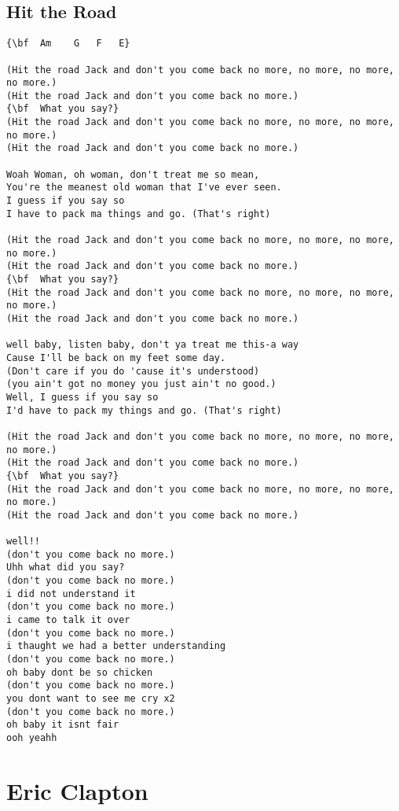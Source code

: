 \documentclass[a4paper]{article}
\begin{document}
\subsection{Hit the Road}
\begin{Verbatim}[commandchars=\\\{\}]
{\bf  Am	G	F	E}

(Hit the road Jack and don't you come back no more, no more, no more, no more.)
(Hit the road Jack and don't you come back no more.)
{\bf  What you say?}
(Hit the road Jack and don't you come back no more, no more, no more, no more.)
(Hit the road Jack and don't you come back no more.)

Woah Woman, oh woman, don't treat me so mean,
You're the meanest old woman that I've ever seen.
I guess if you say so
I have to pack ma things and go. (That's right)

(Hit the road Jack and don't you come back no more, no more, no more, no more.)
(Hit the road Jack and don't you come back no more.)
{\bf  What you say?}
(Hit the road Jack and don't you come back no more, no more, no more, no more.)
(Hit the road Jack and don't you come back no more.)

well baby, listen baby, don't ya treat me this-a way
Cause I'll be back on my feet some day.
(Don't care if you do 'cause it's understood)
(you ain't got no money you just ain't no good.)
Well, I guess if you say so
I'd have to pack my things and go. (That's right)

(Hit the road Jack and don't you come back no more, no more, no more, no more.)
(Hit the road Jack and don't you come back no more.)
{\bf  What you say?}
(Hit the road Jack and don't you come back no more, no more, no more, no more.)
(Hit the road Jack and don't you come back no more.)

well!!
(don't you come back no more.)
Uhh what did you say?
(don't you come back no more.)
i did not understand it
(don't you come back no more.)
i came to talk it over
(don't you come back no more.)
i thaught we had a better understanding
(don't you come back no more.)
oh baby dont be so chicken
(don't you come back no more.)
you dont want to see me cry x2
(don't you come back no more.)
oh baby it isnt fair
ooh yeahh

\end{Verbatim}
\newpage
\section{Eric Clapton}
\end{document}
